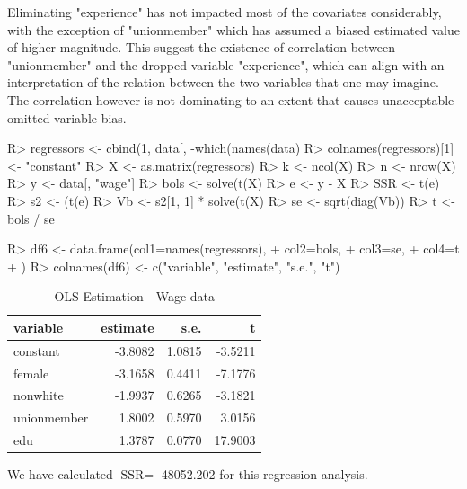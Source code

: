 \documentclass[11pt,reqno]{article}   %
\newcommand{\ksp}{\vspace{0.1in}}   %
\begin{document}
\begin{enumerate}
\ksp 

Eliminating "experience" has not impacted most of the covariates considerably, with the exception of "unionmember" which has assumed a biased estimated value of higher magnitude. This suggest the existence of correlation between "unionmember" and the dropped variable "experience", which can align with an interpretation of the relation between the two variables that one may imagine. The correlation however is not dominating to an extent that causes unacceptable omitted variable bias.
\begin{Schunk}
\begin{Sinput}
R> regressors <- cbind(1, data[, -which(names(data) %
R> colnames(regressors)[1] <- "constant"
R> X <- as.matrix(regressors)
R> k <- ncol(X)
R> n <- nrow(X)
R> y <- data[, "wage"]
R> bols <- solve(t(X) %
R> e <- y - X %
R> SSR <- t(e) %
R> s2 <- (t(e) %
R> Vb <- s2[1, 1] * solve(t(X) %
R> se <- sqrt(diag(Vb))
R> t <- bols / se
\end{Sinput}
\end{Schunk}

\begin{Schunk}
\begin{Sinput}
R> df6 <- data.frame(col1=names(regressors),
+                  col2=bols,
+                  col3=se,
+                  col4=t
+                  )
R> colnames(df6) <- c("variable", "estimate", "s.e.", "t")
\end{Sinput}
\end{Schunk}

\begin{table}[!h]
\centering
\caption{OLS Estimation - Wage data} 
\begin{tabular}{lrrr}
  \hline
variable & estimate & s.e. & t \\ 
  \hline
constant & -3.8082 & 1.0815 & -3.5211 \\ 
  female & -3.1658 & 0.4411 & -7.1776 \\ 
  nonwhite & -1.9937 & 0.6265 & -3.1821 \\ 
  unionmember & 1.8002 & 0.5970 & 3.0156 \\ 
  edu & 1.3787 & 0.0770 & 17.9003 \\ 
   \hline
\end{tabular}
\end{table}

We have calculated $\text{SSR} = $ 48052.202 for this regression analysis. 

\end{enumerate}
\end{document}
